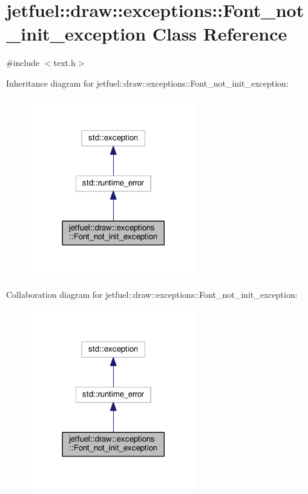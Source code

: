 \hypertarget{classjetfuel_1_1draw_1_1exceptions_1_1Font__not__init__exception}{}\section{jetfuel\+:\+:draw\+:\+:exceptions\+:\+:Font\+\_\+not\+\_\+init\+\_\+exception Class Reference}
\label{classjetfuel_1_1draw_1_1exceptions_1_1Font__not__init__exception}


{\ttfamily \#include $<$text.\+h$>$}



Inheritance diagram for jetfuel\+:\+:draw\+:\+:exceptions\+:\+:Font\+\_\+not\+\_\+init\+\_\+exception\+:\nopagebreak
\begin{figure}[H]
\begin{center}
\leavevmode
\includegraphics[width=206pt]{classjetfuel_1_1draw_1_1exceptions_1_1Font__not__init__exception__inherit__graph}
\end{center}
\end{figure}


Collaboration diagram for jetfuel\+:\+:draw\+:\+:exceptions\+:\+:Font\+\_\+not\+\_\+init\+\_\+exception\+:\nopagebreak
\begin{figure}[H]
\begin{center}
\leavevmode
\includegraphics[width=206pt]{classjetfuel_1_1draw_1_1exceptions_1_1Font__not__init__exception__coll__graph}
\end{center}
\end{figure}
